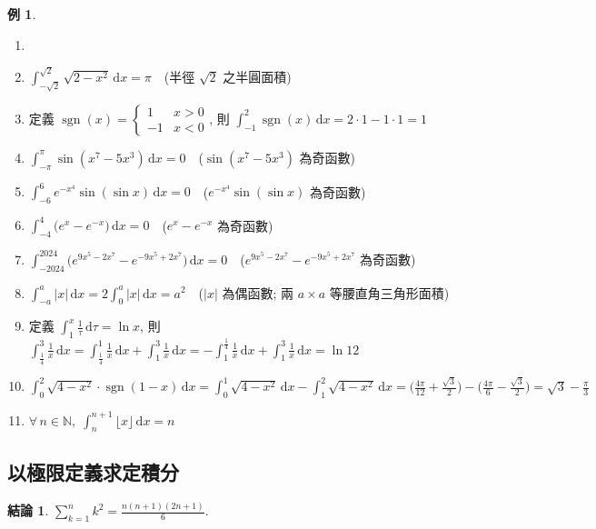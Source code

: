 \documentclass[12pt]{extarticle}
\newcommand{\ds}{\displaystyle}
\DeclareMathOperator*{\sgn}{sgn}
\newcommand{\floor}[1]{\lfloor #1 \rfloor}
\theoremstyle{definition}
\newtheorem*{fact}{結論}
\newtheorem*{ex}{例}
\begin{document}
\begin{ex}
  \begin{enumerate}\setlength{\itemsep}{0pt}
    \item[]
    \item $\ds\int_{-\sqrt{2}}^{\sqrt{2}} \sqrt{2 - x^2}\,\text{d}x = \pi\quad$(半徑 $\sqrt{2}$ 之半圓面積) 
    \item 定義 $\ds\sgn(x)=\begin{cases} 1 & x > 0 \\ -1 & x < 0\end{cases}$, 則 $\ds\int_{-1}^2 \sgn(x)\,\text{d}x = 2\cdot 1 - 1\cdot 1 = 1$
    \item $\ds\int_{-\pi}^{\pi} \sin(x^7-5x^3)\,\text{d}x = 0\quad$($\sin(x^7-5x^3)$ 為奇函數) 
    \item $\ds\int_{-6}^{6} e^{-x^4}\sin(\sin x)\,\text{d}x = 0\quad$($e^{-x^4}\sin(\sin x)$ 為奇函數) 
    \item $\ds\int_{-4}^{4} \big(e^{x} - e^{-x}\big)\,\text{d}x = 0\quad$($e^{x} - e^{-x}$ 為奇函數) 
    \item $\ds\int_{-2024}^{2024} \big(e^{9x^5-2x^7} - e^{-9x^5 + 2x^7}\big)\,\text{d}x = 0\quad$($e^{9x^5-2x^7} - e^{-9x^5 + 2x^7}$ 為奇函數)  
    \item $\ds\int_{-a}^a |x|\,\text{d}x = 2\int_0^a |x|\,\text{d}x = a^2\quad$($|x|$ 為偶函數; 兩 $a\times a$ 等腰直角三角形面積) 
    \item 定義 $\ds\int_1^x\frac{1}{\tau}\,\text{d}\tau = \ln x$, 則 $\ds\int_{\frac{1}{4}}^3\frac{1}{x}\,\text{d}x = \int_{\frac{1}{4}}^1 \frac{1}{x}\,\text{d}x + \int_1^3 \frac{1}{x}\,\text{d}x = -\int_1^{\frac{1}{4}}\frac{1}{x}\,\text{d}x + \int_1^3\frac{1}{x}\,\text{d}x = \ln 12$
    \item $\ds\int_0^2 \sqrt{4 - x^2}\cdot\sgn(1 - x)\,\text{d}x = \int_0^1\sqrt{4 - x^2}\,\text{d}x - \int_1^2\sqrt{4 - x^2}\,\text{d}x = \Big(\frac{4\pi}{12} + \frac{\sqrt{3}}{2}\Big) - \Big(\frac{4\pi}{6} - \frac{\sqrt{3}}{2}\Big) = \sqrt{3} - \frac{\pi}{3}$ 
    \item $\ds\forall\,n\in\mathbb{N},\;\int_n^{n+1}\floor{x}\,\text{d}x = n$ 
  \end{enumerate}
\end{ex}

\subsection*{以極限定義求定積分}

\begin{fact}
  $\ds\sum_{k = 1}^n k^2 = \frac{n(n + 1)(2n + 1)}{6}$. 
\end{fact}
\end{document}
